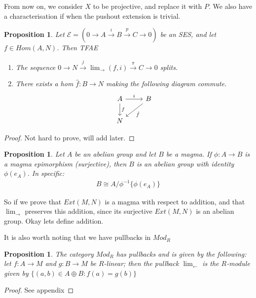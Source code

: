 \documentclass[12pt]{book}
\newtheorem{proposition}[theorem]{Proposition}
\theoremstyle{definition}
\begin{document}
From now on, we consider $X$ to be projective, and replace it with $P$. We also have a characterisation if when the pushout extension is trivial.

\begin{proposition}\label{TrivPushoutExtension}
    Let $\mathcal{E} = ( 0 \rightarrow A \xrightarrow{i} B \xrightarrow{p} C \rightarrow 0)$ be an SES, and let $f \in Hom(A,N)$. Then TFAE 
    \begin{enumerate}
        \item The sequence $0 \rightarrow N \xrightarrow{j} \lim_{\rightarrow}(f, i) \xrightarrow{\pi} C \rightarrow 0$ splits. 
        \item There exists a hom $\hat{f} : B \to N$ making the following diagram commute.
        \[
        \begin{tikzcd}
            A \arrow[d, "f"] \arrow[r, "i"] & B \arrow[ld, "\hat{f}"]\\
            N
        \end{tikzcd}
        \]
    \end{enumerate} 
\end{proposition}
\begin{proof}
    Not hard to prove, will add later. 
\end{proof}
\begin{proposition}\label{Magma}
    Let $A$ be an abelian group and let $B$ be a magma. If $\phi : A \to B$ is a magma epimorphism (surjective), then $B$ is an abelian group with identity $\phi(e_A)$. In specific: 
    \begin{align*}
        B \cong A/\phi^{-1}\{\phi(e_A)\}
    \end{align*}
\end{proposition}

So if we prove that $Ext(M,N)$ is a magma with respect to addition, and that $\lim_{\rightarrow}$ preserves this addition, since its surjective $Ext(M,N)$ is an abelian group. Okay lets define addition. 

It is also worth noting that we have pullbacks in $Mod_R$

\begin{proposition}
    The category $Mod_R$ has pullbacks and is given by the following: let $f: A \to M$ and $g: B \to M$ be $R$-linear; then the pullback $\lim_{\leftarrow}$ is the $R$-module given by $\{(a,b) \in A \oplus B : f(a) = g(b)\}$
\end{proposition}
\begin{proof}
    See appendix
\end{proof}
 
\end{document}

